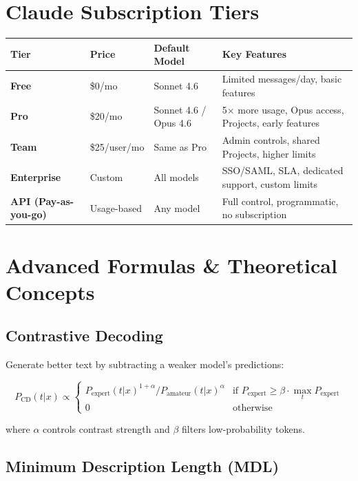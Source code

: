 \documentclass[11pt,a4paper]{article}
\begin{document}
\section{Claude Subscription Tiers}

\begin{center}
\begin{tabular}{L{3cm}llL{5cm}}
\toprule
\textbf{Tier} & \textbf{Price} & \textbf{Default Model} & \textbf{Key Features} \\
\midrule
\textbf{Free} & \$0/mo & Sonnet 4.6 & Limited messages/day, basic features \\
\textbf{Pro} & \$20/mo & Sonnet 4.6 / Opus 4.6 & 5$\times$ more usage, Opus access, Projects, early features \\
\textbf{Team} & \$25/user/mo & Same as Pro & Admin controls, shared Projects, higher limits \\
\textbf{Enterprise} & Custom & All models & SSO/SAML, SLA, dedicated support, custom limits \\
\midrule
\textbf{API (Pay-as-you-go)} & Usage-based & Any model & Full control, programmatic, no subscription \\
\bottomrule
\end{tabular}
\end{center}

\section{Advanced Formulas \& Theoretical Concepts}

\subsection{Contrastive Decoding}

Generate better text by subtracting a weaker model's predictions:

$$P_{\text{CD}}(t | x) \propto \begin{cases} P_{\text{expert}}(t|x)^{1+\alpha} / P_{\text{amateur}}(t|x)^\alpha & \text{if } P_{\text{expert}} \geq \beta \cdot \max_t P_{\text{expert}} \\ 0 & \text{otherwise} \end{cases}$$

where $\alpha$ controls contrast strength and $\beta$ filters low-probability tokens.

\subsection{Minimum Description Length (MDL)}
\end{document}
